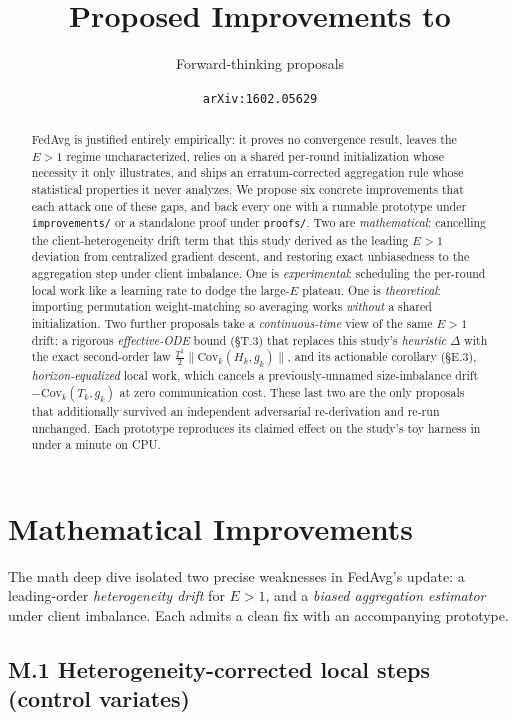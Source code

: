 \documentclass[11pt]{article}
\title{Proposed Improvements to \citet{mcmahan2017fedavg}}
\author{Forward-thinking proposals}
\date{\texttt{arXiv:1602.05629}}
\begin{document}
\maketitle

\begin{abstract}
FedAvg \citep{mcmahan2017fedavg} is justified entirely empirically: it proves no convergence result, leaves the $E>1$ regime uncharacterized, relies on a shared per-round initialization whose necessity it only illustrates, and ships an erratum-corrected aggregation rule whose statistical properties it never analyzes. We propose six concrete improvements that each attack one of these gaps, and back every one with a runnable prototype under \texttt{improvements/} or a standalone proof under \texttt{proofs/}. Two are \emph{mathematical}: cancelling the client-heterogeneity drift term that this study derived as the leading $E>1$ deviation from centralized gradient descent, and restoring exact unbiasedness to the aggregation step under client imbalance. One is \emph{experimental}: scheduling the per-round local work like a learning rate to dodge the large-$E$ plateau. One is \emph{theoretical}: importing permutation weight-matching so averaging works \emph{without} a shared initialization. Two further proposals take a \emph{continuous-time} view of the same $E>1$ drift: a rigorous \emph{effective-ODE} bound (\S T.3) that replaces this study's \emph{heuristic} $\Delta$ with the exact second-order law $\tfrac{T^2}{2}\lVert\mathrm{Cov}_k(H_k,g_k)\rVert$, and its actionable corollary (\S E.3), \emph{horizon-equalized} local work, which cancels a previously-unnamed size-imbalance drift $-\mathrm{Cov}_k(T_k,g_k)$ at zero communication cost. These last two are the only proposals that additionally survived an independent adversarial re-derivation and re-run unchanged. Each prototype reproduces its claimed effect on the study's toy harness in under a minute on CPU.
\end{abstract}

\section*{Mathematical Improvements}

The math deep dive isolated two precise weaknesses in FedAvg's update: a leading-order \emph{heterogeneity drift} for $E>1$, and a \emph{biased aggregation estimator} under client imbalance. Each admits a clean fix with an accompanying prototype.

\subsection*{M.1 Heterogeneity-corrected local steps (control variates)}
\end{document}
